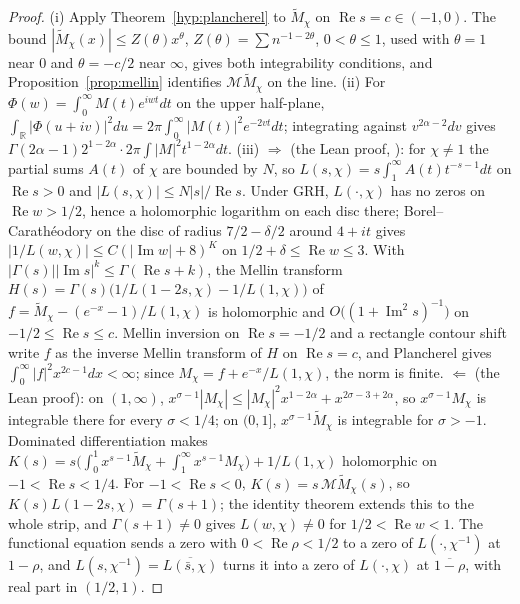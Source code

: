 \documentclass[11pt]{amsart}
\newcommand{\lean}{\path}
\theoremstyle{definition}
\theoremstyle{remark}
\newcommand{\Mt}{\widetilde{M}_\chi}
\newcommand{\Mel}{\mathcal{M}}
\newcommand{\R}{\mathbb{R}}
\renewcommand{\Re}{\operatorname{Re}}
\renewcommand{\Im}{\operatorname{Im}}
\begin{document}
\begin{proof}
(i) Apply Theorem~\ref{hyp:plancherel} to $\Mt$ on $\Re s=c\in(-1,0)$. The bound $|\Mt(x)|\le Z(\theta)x^\theta$,
$Z(\theta)=\sum n^{-1-2\theta}$, $0<\theta\le1$, used with $\theta=1$ near $0$ and $\theta=-c/2$ near $\infty$, gives
both integrability conditions, and Proposition~\ref{prop:mellin} identifies $\Mel\Mt$ on the line.
(ii) For $\Phi(w)=\int_0^\infty M(t)e^{iwt}dt$ on the upper half-plane, $\int_\R|\Phi(u+iv)|^2du=2\pi\int_0^\infty|M(t)|^2e^{-2vt}dt$;
integrating against $v^{2\alpha-2}dv$ gives $\Gamma(2\alpha-1)2^{1-2\alpha}\cdot2\pi\int|M|^2t^{1-2\alpha}dt$.
(iii) $\Rightarrow$ (the Lean proof, \lean{finiteNorms_of_GRH}): for $\chi\ne1$ the partial sums $A(t)$ of $\chi$ are
bounded by $N$, so $L(s,\chi)=s\int_1^\infty A(t)t^{-s-1}dt$ on $\Re s>0$ and $|L(s,\chi)|\le N|s|/\Re s$. Under GRH,
$L(\cdot,\chi)$ has no zeros on $\Re w>1/2$, hence a holomorphic logarithm on each disc there; Borel--Carath\'eodory on
the disc of radius $7/2-\delta/2$ around $4+it$ gives $|1/L(w,\chi)|\le C(|\Im w|+8)^K$ on $1/2+\delta\le\Re w\le3$.
With $|\Gamma(s)||\Im s|^k\le\Gamma(\Re s+k)$, the Mellin transform
$H(s)=\Gamma(s)\bigl(1/L(1-2s,\chi)-1/L(1,\chi)\bigr)$ of $f=\Mt-(e^{-x}-1)/L(1,\chi)$ is holomorphic and
$O\bigl((1+\Im^2s)^{-1}\bigr)$ on $-1/2\le\Re s\le c$. Mellin inversion on $\Re s=-1/2$ and a rectangle contour shift write
$f$ as the inverse Mellin transform of $H$ on $\Re s=c$, and Plancherel gives $\int_0^\infty|f|^2x^{2c-1}dx<\infty$;
since $M_\chi=f+e^{-x}/L(1,\chi)$, the norm is finite. $\Leftarrow$ (the Lean proof): on $(1,\infty)$,
$x^{\sigma-1}|M_\chi|\le|M_\chi|^2x^{1-2\alpha}+x^{2\sigma-3+2\alpha}$, so $x^{\sigma-1}M_\chi$ is integrable there for
every $\sigma<1/4$; on $(0,1]$, $x^{\sigma-1}\Mt$ is integrable for $\sigma>-1$. Dominated differentiation makes
$K(s)=s\bigl(\int_0^1x^{s-1}\Mt+\int_1^\infty x^{s-1}M_\chi\bigr)+1/L(1,\chi)$ holomorphic on $-1<\Re s<1/4$. For
$-1<\Re s<0$, $K(s)=s\,\Mel\Mt(s)$, so $K(s)L(1-2s,\chi)=\Gamma(s+1)$; the identity theorem extends this to the whole
strip, and $\Gamma(s+1)\ne0$ gives $L(w,\chi)\ne0$ for $1/2<\Re w<1$. The functional equation sends a zero with
$0<\Re\rho<1/2$ to a zero of $L(\cdot,\chi^{-1})$ at $1-\rho$, and $L(s,\chi^{-1})=\overline{L(\bar s,\chi)}$ turns it into a
zero of $L(\cdot,\chi)$ at $\overline{1-\rho}$, with real part in $(1/2,1)$.
\end{proof}
\end{document}
